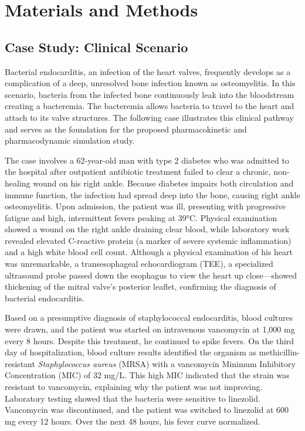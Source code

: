 \documentclass[utf8]{FrontiersinHarvard} %
\begin{document}
\section{Materials and Methods}

\subsection{Case Study: Clinical Scenario}
Bacterial endocarditis, an infection of the heart valves, frequently develops as a complication of a deep, unresolved bone infection known as osteomyelitis. In this scenario, bacteria from the infected bone continuously leak into the bloodstream creating a bacteremia. The bacteremia allows bacteria to travel to the heart and attach to its valve structures. The following case illustrates this clinical pathway and serves as the foundation for the proposed pharmacokinetic and pharmacodynamic simulation study.

The case involves a 62-year-old man with type 2 diabetes who was admitted to the hospital after outpatient antibiotic treatment failed to clear a chronic, non-healing wound on his right ankle. Because diabetes impairs both circulation and immune function, the infection had spread deep into the bone, causing right ankle osteomyelitis. Upon admission, the patient was ill, presenting with progressive fatigue and high, intermittent fevers peaking at 39°C. Physical examination showed a wound on the right ankle draining clear blood, while laboratory work revealed elevated C-reactive protein (a marker of severe systemic inflammation) and a high white blood cell count. Although a physical examination of his heart was unremarkable, a transesophageal echocardiogram (TEE), a specialized ultrasound probe passed down the esophagus to view the heart up close---showed thickening of the mitral valve's posterior leaflet, confirming the diagnosis of bacterial endocarditis.

Based on a presumptive diagnosis of staphylococcal endocarditis, blood cultures were drawn, and the patient was started on intravenous vancomycin at 1,000 mg every 8 hours. Despite this treatment, he continued to spike fevers. On the third day of hospitalization, blood culture results identified the organism as methicillin-resistant \textit{Staphylococcus aureus} (MRSA) with a vancomycin Minimum Inhibitory Concentration (MIC) of 32 mg/L. This high MIC indicated that the strain was resistant to vancomycin, explaining why the patient was not improving. Laboratory testing showed that the bacteria were sensitive to linezolid. Vancomycin was discontinued, and the patient was switched to linezolid at 600 mg every 12 hours. Over the next 48 hours, his fever curve normalized.
\end{document}
